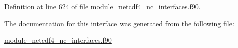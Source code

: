 Definition at line 624 of file module\+\_\+netcdf4\+\_\+nc\+\_\+interfaces.\+f90.



The documentation for this interface was generated from the following file\+:\begin{DoxyCompactItemize}
\item 
\hyperlink{module__netcdf4__nc__interfaces_8f90}{module\+\_\+netcdf4\+\_\+nc\+\_\+interfaces.\+f90}\end{DoxyCompactItemize}
